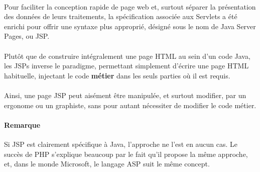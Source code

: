 { 
 \paragraph{} Pour faciliter la conception rapide de page web et, surtout séparer la présentation
 des données de leurs traitements, la spécification associée aux Servlets a été enrichi pour offrir
 une syntaxe plus approprié, désigné sous le nom de Java Server Pages, ou JSP.

 \paragraph{} Plutôt que de construire intégralement une page HTML au sein d'un code Java, les JSPs
 inverse le paradigme, permettant simplement d'écrire une page HTML habituelle, injectant le code
 \textbf{métier} dans les seuls parties où il est requis.

 \paragraph{} Ainsi, une page JSP peut aisément être manipulée, et surtout modifier, par un
 ergonome ou un graphiste, sans pour autant nécessiter de modifier le code métier.

 \paragraph{Remarque} Si JSP est clairement spécifique à Java, l'approche ne l'est en aucun cas. Le
 succès de PHP s'explique beaucoup par le fait qu'il propose la même approche, et, dans le monde
 Microsoft, le langage ASP suit le même concept.

}
